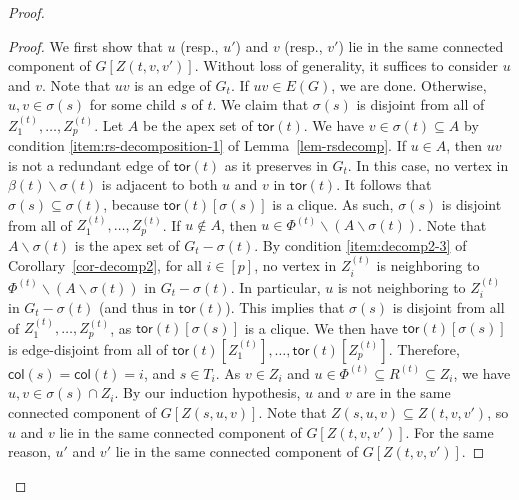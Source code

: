 \documentclass[a4paper,11pt]{article}
\numberwithin{lemma}{section}
\newenvironment{claimproof}{\begin{proof}\renewcommand{\qedsymbol}{$\lrcorner$}}{\end{proof}}
\newcommand{\tor}{\mathsf{tor}}
\begin{document}
\begin{proof}
\begin{claimproof}
We first show that $u$ (resp., $u'$) and $v$ (resp., $v'$) lie in the same connected component of $G[Z(t,v,v')]$.
Without loss of generality, it suffices to consider $u$ and $v$.
Note that $uv$ is an edge of $G_t$.
If $uv \in E(G)$, we are done.
Otherwise, $u,v \in \sigma(s)$ for some child $s$ of $t$.
We claim that $\sigma(s)$ is disjoint from all of $Z_1^{(t)},\dots,Z_p^{(t)}$.
Let $A$ be the apex set of $\tor(t)$.
We have $v \in \sigma(t) \subseteq A$ by condition \ref{item:rs-decomposition-1} of Lemma~\ref{lem-rsdecomp}.
If $u \in A$, then $uv$ is not a redundant edge of $\tor(t)$ as it preserves in $G_t$.
In this case, no vertex in $\beta(t) \backslash \sigma(t)$ is adjacent to both $u$ and $v$ in $\tor(t)$.
It follows that $\sigma(s) \subseteq \sigma(t)$, because $\tor(t)[\sigma(s)]$ is a clique.
As such, $\sigma(s)$ is disjoint from all of $Z_1^{(t)},\dots,Z_p^{(t)}$.
If $u \notin A$, then $u \in \varPhi^{(t)} \backslash (A \backslash \sigma(t))$.
Note that $A \backslash \sigma(t)$ is the apex set of $G_t - \sigma(t)$.
By condition \ref{item:decomp2-3} of Corollary~\ref{cor-decomp2}, for all $i \in [p]$, no vertex in $Z_i^{(t)}$ is neighboring to $\varPhi^{(t)} \backslash (A \backslash \sigma(t))$ in $G_t - \sigma(t)$.
In particular, $u$ is not neighboring to $Z_i^{(t)}$ in $G_t - \sigma(t)$ (and thus in $\tor(t)$).
This implies that $\sigma(s)$ is disjoint from all of $Z_1^{(t)},\dots,Z_p^{(t)}$, as $\tor(t)[\sigma(s)]$ is a clique.
We then have $\tor(t)[\sigma(s)]$ is edge-disjoint from all of $\tor(t)[Z_1^{(t)}],\dots,\tor(t)[Z_p^{(t)}]$.
Therefore, $\mathsf{col}(s) = \mathsf{col}(t) = i$, and $s \in T_i$.
As $v \in Z_i$ and $u \in \varPhi^{(t)} \subseteq R^{(t)} \subseteq Z_i$, we have $u,v \in \sigma(s) \cap Z_i$.
By our induction hypothesis, $u$ and $v$ are in the same connected component of $G[Z(s,u,v)]$.
Note that $Z(s,u,v) \subseteq Z(t,v,v')$, so $u$ and $v$ lie in the same connected component of $G[Z(t,v,v')]$.
For the same reason, $u'$ and $v'$ lie in the same connected component of $G[Z(t,v,v')]$.


\end{claimproof}
\end{proof}
\end{document}
